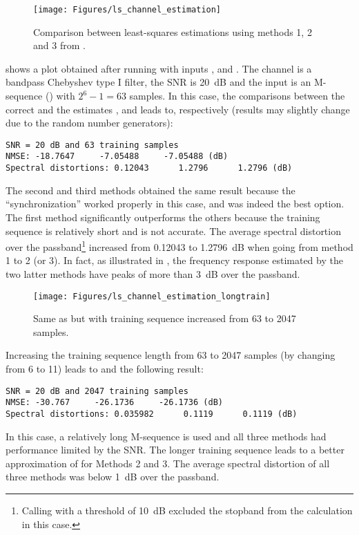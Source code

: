 \begin{figure}
\centering
\texttt{[image: Figures/ls\_channel\_estimation]}
\caption{Comparison between least-squares estimations using methods 1, 2 and 3 from .\label{fig:ls_channel_estimation}}
\end{figure}

 shows a plot obtained after running  with inputs
,  and . The channel is a bandpass Chebyshev type I filter, the SNR is 20~dB and the input is an M-sequence () with $2^6-1=63$ samples. In this case, the comparisons between the correct  and the estimates ,  and  leads to, respectively (results may slightly change due to the random number generators):
\begin{verbatim}
SNR = 20 dB and 63 training samples
NMSE: -18.7647     -7.05488     -7.05488 (dB)
Spectral distortions: 0.12043      1.2796      1.2796 (dB)
\end{verbatim}
The second and third methods obtained the same result because the ``synchronization''
worked properly in this case, and  was indeed the best option.
The first method significantly outperforms the others because the training sequence is
relatively short and  is not accurate. The average spectral distortion over the passband\footnote{Calling  with a threshold of 10~dB excluded the stopband from the calculation in this case.} 
increased from 0.12043 to 1.2796~dB when going from method 1 to 2 (or 3). In fact, as illustrated in , the frequency response estimated by the two latter methods have peaks of more than 3~dB over
the passband.

\begin{figure}
\centering
\texttt{[image: Figures/ls\_channel\_estimation\_longtrain]}
\caption{Same as  but with training sequence increased from 63 to 2047 samples.\label{fig:ls_channel_estimation_longtrain}}
\end{figure}

Increasing the training sequence length from 63 to 2047 samples (by changing  from 6 to 11) leads to  and the following result:
\begin{verbatim}
SNR = 20 dB and 2047 training samples
NMSE: -30.767     -26.1736     -26.1736 (dB)
Spectral distortions: 0.035982      0.1119      0.1119 (dB)
\end{verbatim}
In this case, a relatively long M-sequence is used and all three
methods had performance limited by the SNR. The longer training sequence leads to a better approximation of  for Methods 2 and 3.
The average spectral distortion of all three methods was below 1~dB over the passband.

